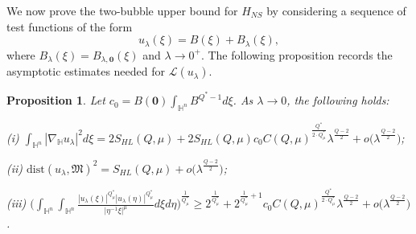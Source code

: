 \documentclass[10pt,a4paper]{amsart}
\newtheorem{proposition}{Proposition}[section]
\begin{document}
{We now prove the two-bubble upper bound for $H_{NS}$ by considering a sequence of test}
functions of the form
\begin{equation*}
 u_\lambda(\xi)=B(\xi)+B_\lambda(\xi),
\end{equation*}
where $B_\lambda(\xi)=B_{\lambda,\mathbf{0}}(\xi)$ and $\lambda\rightarrow 0^+$. {The following proposition records the asymptotic estimates needed for $\mathcal{L}(u_\lambda)$.}
\begin{proposition}\label{p4.1}
Let $c_0=B(\mathbf{0})\int_{\mathbb{H}^{n}} B^{Q^{\ast}-1}d\xi$.
As $\lambda\rightarrow0$, the following holds:

(i) $\int_{\mathbb{H}^{n}}|\nabla_{\mathbb{H}} u_\lambda|^{2}{d}\xi=2S_{HL}(Q,\mu)+2S_{HL}(Q,\mu)
c_0C(Q,\mu)^{\frac{Q^{\ast}}{2\cdot Q^{\ast}_{\mu}}}\lambda^{\frac{Q-2}{2}}+o\big(\lambda^{\frac{Q-2}{2}}\big)$;

(ii) $\mathrm{dist}(u_\lambda,\mathfrak{M})^2=S_{HL}(Q,\mu)+o\big(\lambda^{\frac{Q-2}{2}}\big)$;

{(iii) $\Big(\int_{\mathbb{H}^{n}}\int_{\mathbb{H}^{n}}\frac{|u_\lambda(\xi)|^{Q^{\ast}_{\mu}}|u_\lambda(\eta)|
^{Q^{\ast}_{\mu}}}{|\eta^{-1}\xi|^{\mu}}{d}\xi{d}\eta\Big)^{\frac{1}{Q^{\ast}_{\mu}}}\geq2^{\frac{1}{Q^{\ast}_{\mu}}}+
2^{\frac{1}{Q^{\ast}_{\mu}}+1}c_0C(Q,\mu)^{\frac{Q^{\ast}}{2\cdot Q^{\ast}_{\mu}}}\lambda^{\frac{Q-2}{2}}+o\big(\lambda^{\frac{Q-2}{2}}\big)$.}
\end{proposition}
\end{document}
